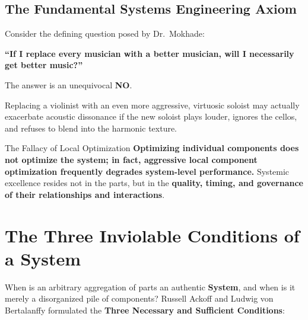 \subsection{The Fundamental Systems Engineering Axiom}
Consider the defining question posed by Dr.~Mokhade:
\begin{center}
\textbf{\large ``If I replace every musician with a better musician, will I necessarily get better music?''}
\end{center}
The answer is an unequivocal \textbf{NO}. 

Replacing a violinist with an even more aggressive, virtuosic soloist may actually exacerbate acoustic dissonance if the new soloist plays louder, ignores the cellos, and refuses to blend into the harmonic texture.

\begin{takeawaybox}{The Fallacy of Local Optimization}
\textbf{Optimizing individual components does not optimize the system; in fact, aggressive local component optimization frequently degrades system-level performance.}
Systemic excellence resides not in the parts, but in the \textbf{quality, timing, and governance of their relationships and interactions}.
\end{takeawaybox}

\section{The Three Inviolable Conditions of a System}
\label{sec:three_conditions}

When is an arbitrary aggregation of parts an authentic \textbf{System}, and when is it merely a disorganized pile of components? Russell Ackoff and Ludwig von Bertalanffy formulated the \textbf{Three Necessary and Sufficient Conditions}:

